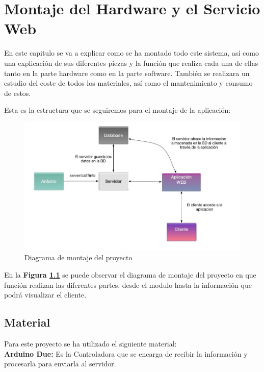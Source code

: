 
\chapter{Montaje del Hardware y el Servicio Web}

\setlength{\parindent}{5ex}En este capitulo se va a explicar como se ha montado todo este sistema, así como una explicación de sus diferentes piezas y la función que realiza cada una de ellas tanto en la parte hardware como en la parte software.
También se realizara un estudio del coste de todos los materiales, así como el mantenimiento y consumo de estos.

\setlength{\parindent}{0ex}Esta es la estructura que se seguiremos para el montaje de la aplicación:

\begin{figure}[!h]
	\centering
	\includegraphics[width=1.0\linewidth]{figuras/montage1}
	\caption{Diagrama de montaje del proyecto}
	\label{fig:imgmontage1}
\end{figure}

En la \textbf{Figura \ref{fig:imgmontage1}} se puede observar el diagrama de montaje del proyecto en que función realizan las diferentes partes, desde el modulo hasta la información que podrá visualizar el cliente.

\section{Material}

\setlength{\parindent}{0ex}Para este proyecto se ha utilizado el siguiente material:\\

\textbf{Arduino Due:} Es la Controladora que se encarga de recibir la información y procesarla para enviarla al servidor.

